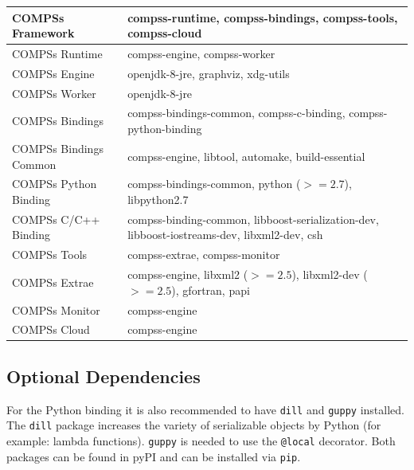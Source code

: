 \bgroup
  \def\arraystretch{1.5}
  \begin{center}
    \begin{tabular}{ p{6cm} | p{10cm} }
    COMPSs Framework 		& compss-runtime, compss-bindings, compss-tools, compss-cloud \\ \hline 
    COMPSs Runtime 		& compss-engine, compss-worker \\ \hline  
    COMPSs Engine 		& openjdk-8-jre, graphviz, xdg-utils \\ \hline 
    COMPSs Worker 		& openjdk-8-jre \\ \hline 
    COMPSs Bindings 		& compss-bindings-common, compss-c-binding, compss-python-binding \\ \hline 
    COMPSs Bindings Common 	& compss-engine, libtool, automake, build-essential \\ \hline 
    COMPSs Python Binding 	& compss-bindings-common, python ($>= 2.7$), libpython2.7 \\ \hline 
    COMPSs C/C++ Binding 	& compss-binding-common, libboost-serialization-dev, libboost-iostreams-dev, libxml2-dev, csh \\ \hline 
    COMPSs Tools 		& compss-extrae, compss-monitor \\ \hline 
    COMPSs Extrae 		& compss-engine, libxml2 ($>= 2.5$), libxml2-dev ($>= 2.5$), gfortran, papi \\ \hline 
    COMPSs Monitor 		& compss-engine \\ \hline 
    COMPSs Cloud 		& compss-engine    
    \end{tabular}
  \end{center}
\egroup

\subsection{Optional Dependencies}
For the Python binding it is also recommended to have \verb|dill| and \verb|guppy| installed. The \verb|dill| package increases
the variety of serializable objects by Python (for example: lambda functions). \verb|guppy| is needed to use the \verb|@local|
decorator. Both packages can be found in pyPI and can be installed via \verb|pip|.
